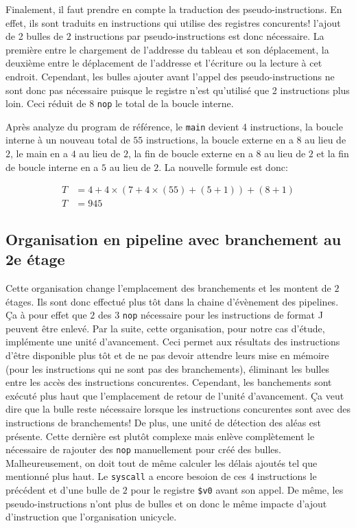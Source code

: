 \documentclass[a11paper]{article}
\begin{document}
Finalement, il faut prendre en compte la traduction des pseudo-instructions.
En effet, ils sont traduits en instructions qui utilise des registres
concurents! l'ajout de 2 bulles de $2$ instructions par pseudo-instructions
est donc nécessaire. La première entre le chargement de l'addresse du tableau
et son déplacement, la deuxième entre le déplacement de l'addresse et
l'écriture ou la lecture à cet endroit. Cependant, les bulles ajouter avant
l'appel des pseudo-instructions ne sont donc pas nécessaire puisque le
registre n'est qu'utilisé que 2 instructions plus loin. Ceci réduit de 8
\verb|nop| le total de la boucle interne.

Après analyze du program de référence, le \verb|main| devient 4 instructions,
la boucle interne à un nouveau total de $55$ instructions, la boucle externe
en a $8$ au lieu de $2$, le main en a $4$ au lieu de $2$, la fin de boucle
externe en a $8$ au lieu de $2$ et la fin de boucle interne en a $5$ au lieu
de $2$. La nouvelle formule est donc:

\begin{align}
  T &= 4+ 4\times(7+4\times(55)+(5+1)) + (8+1) \\
  T &= 945
\end{align}

\subsection{Organisation en pipeline avec branchement au 2e étage}

Cette organisation change l'emplacement des branchements et les montent de
$2$ étages. Ils sont donc effectué plus tôt dans la chaine d'évènement des
pipelines. Ça à pour effet que $2$ des $3$ \verb|nop| nécessaire pour les
instructions de format J peuvent être enlevé. Par la suite, cette
organisation, pour notre cas d'étude, implémente une unité d'avancement. Ceci
permet aux résultats des instructions d'être disponible plus tôt et de ne pas
devoir attendre leurs mise en mémoire (pour les instructions qui ne sont pas
des branchements), éliminant les bulles entre les accès des instructions
concurentes. Cependant, les banchements sont exécuté plus haut que
l'emplacement de retour de l'unité d'avancement. Ça veut dire que la bulle
reste nécessaire lorsque les instructions concurentes sont avec des
instructions de branchements! De plus, une unité de détection des aléas est
présente. Cette dernière est plutôt complexe mais enlève complètement le
nécessaire de rajouter des \verb|nop| manuellement pour créé des bulles.
Malheureusement, on doit tout de même calculer les délais ajoutés tel que
mentionné plus haut. Le \verb|syscall| a encore besoion de ces $4$
instructions le précédent et d'une bulle de $2$ pour le registre \verb|$v0|
avant son appel. De même, les pseudo-instructions n'ont plus de bulles et on
donc le même impacte d'ajout d'instruction que l'organisation unicycle.
\end{document}
